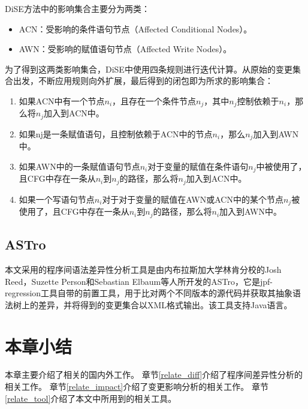 DiSE方法中的影响集合主要分为两类：
\begin{itemize}
	\item ACN：受影响的条件语句节点（Affected Conditional Nodes）。
	\item AWN：受影响的赋值语句节点（Affected Write Nodes）。
\end{itemize}

为了得到这两类影响集合，DiSE中使用四条规则进行迭代计算。从原始的变更集合出发，不断应用规则向外扩展，最后得到的闭包即为所求的影响集合：
\begin{enumerate}
	\item 如果ACN中有一个节点$n_i$，且存在一个条件节点$n_j$，其中$n_j$控制依赖于$n_i$，那么将$n_j$加入到ACN中。
	\item 如果nj是一条赋值语句，且控制依赖于ACN中的节点$n_i$，那么$n_j$加入到AWN中。
	     
%	     
	\item 如果AWN中的一条赋值语句节点$n_i$对于变量的赋值在条件语句$n_j$中被使用了，且CFG中存在一条从$n_i$到$n_j$的路径，那么将$n_j$加入到ACN中。

	\item 如果一个写语句节点$n_i$对于对于变量的赋值在AWN或ACN中的某个节点$n_j$被使用了，且CFG中存在一条从$n_i$到$n_j$的路径，那么将$n_i$加入到AWN中。

\end{enumerate}



\subsection{ASTro}	

	本文采用的程序间语法差异性分析工具是由内布拉斯加大学林肯分校的Josh Reed，Suzette Person和Sebastian Elbaum等人所开发的ASTro，它是jpf-regression工具自带的前置工具，用于比对两个不同版本的源代码并获取其抽象语法树上的差异，并将得到的变更集合以XML格式输出。该工具支持Java语言。
	
\section{本章小结}
本章主要介绍了相关的国内外工作。
章节\ref{relate_diff}介绍了程序间差异性分析的相关工作。
章节\ref{relate_impact}介绍了变更影响分析的相关工作。
章节\ref{relate_tool}介绍了本文中所用到的相关工具。
	